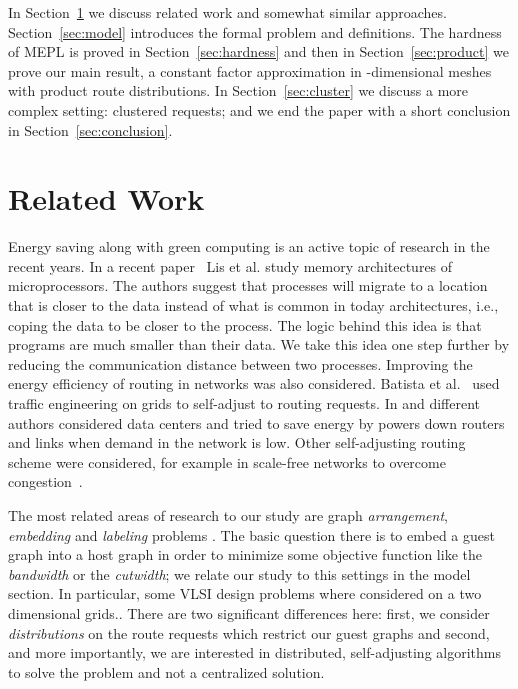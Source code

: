 \documentclass[conference]{IEEEtran}
\begin{document}
In Section~\ref{sec:related} we discuss related work and somewhat similar approaches. Section~\ref{sec:model} introduces the formal problem and definitions. The hardness of MEPL is proved in Section~\ref{sec:hardness} and then in Section~\ref{sec:product} we prove our main result, a constant factor approximation in -dimensional meshes with product route distributions.
In Section~\ref{sec:cluster} we discuss a more complex setting: clustered requests; and we end the paper with a short conclusion in Section~\ref{sec:conclusion}.
 
\section{Related Work} \label{sec:related}



Energy saving along with green computing is an active topic of research in the recent years.
In a recent paper~\cite{lis2011brief} Lis et al. study memory architectures of microprocessors. The authors suggest that processes will migrate to a location that is closer to the data instead of what is common in today architectures, i.e., coping the data to be closer to the process. The logic behind this idea is that programs are much smaller than their data. We take this idea one step further by reducing the communication distance between two processes. 
Improving the energy efficiency of routing in networks was also considered. Batista et al.~\cite{batista2007self} used traffic engineering on grids to self-adjust to routing requests. 
In \cite{heller2010elastictree} and \cite{Shang2010Energy-aware} different authors considered data centers and tried to save energy by powers down routers and links when demand in the network  is low. Other self-adjusting routing scheme were considered, for example in scale-free networks to overcome congestion~\cite{PhysRevE.80.026114, Zhang2007177}.

The most related areas of research to our study are graph \emph{arrangement}, \emph{embedding} and \emph{labeling} problems \cite{chung1988labelings,Diaz2002A-survey}. The basic question there is to embed a guest graph  into a host graph  in order to minimize some objective function like the \emph{bandwidth} or the \emph{cutwidth}; we relate our study to this settings in the model section. In particular, some VLSI design problems where considered on a two dimensional grids.\cite{bhatt1987complexity,bhatt1984framework}. There are two significant differences here: first, we consider \emph{distributions} on the route requests which restrict our guest graphs and second, and more importantly, we are interested in distributed, self-adjusting algorithms to solve the problem and not a centralized solution.
\end{document}
